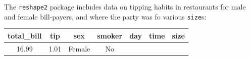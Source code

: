 \documentclass[]{article}
\newenvironment{Shaded}{\begin{snugshade}}{\end{snugshade}}
\newcommand{\StringTok}[1]{\textcolor[rgb]{0.31,0.60,0.02}{#1}}
\newcommand{\OperatorTok}[1]{\textcolor[rgb]{0.81,0.36,0.00}{\textbf{#1}}}
\newcommand{\NormalTok}[1]{#1}
\theoremstyle{definition}
\theoremstyle{definition}
\theoremstyle{definition}
\theoremstyle{remark}
\begin{document}
The \texttt{reshape2} package includes data on tipping habits in
restaurants for male and female bill-payers, and where the party was fo
various \texttt{size}s:

\begin{Shaded}
\end{Shaded}

\begin{longtable}[]{@{}ccccccc@{}}
\toprule
\begin{minipage}[b]{0.15\columnwidth}\centering\strut
total\_bill\strut
\end{minipage} & \begin{minipage}[b]{0.08\columnwidth}\centering\strut
tip\strut
\end{minipage} & \begin{minipage}[b]{0.10\columnwidth}\centering\strut
sex\strut
\end{minipage} & \begin{minipage}[b]{0.10\columnwidth}\centering\strut
smoker\strut
\end{minipage} & \begin{minipage}[b]{0.07\columnwidth}\centering\strut
day\strut
\end{minipage} & \begin{minipage}[b]{0.10\columnwidth}\centering\strut
time\strut
\end{minipage} & \begin{minipage}[b]{0.07\columnwidth}\centering\strut
size\strut
\end{minipage}\tabularnewline
\midrule
\endhead
\begin{minipage}[t]{0.15\columnwidth}\centering\strut
16.99\strut
\end{minipage} & \begin{minipage}[t]{0.08\columnwidth}\centering\strut
1.01\strut
\end{minipage} & \begin{minipage}[t]{0.10\columnwidth}\centering\strut
Female\strut
\end{minipage} & \begin{minipage}[t]{0.10\columnwidth}\centering\strut
No\strut
\end{minipage} & \begin{minipage}[t]{0.07\columnwidth}\centering\strut

\end{minipage}
\end{longtable}
\end{document}
